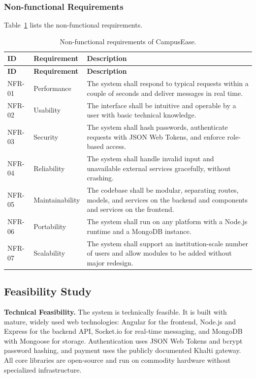 \documentclass[12pt,a4paper]{report}
\begin{document}
\subsubsection{Non-functional Requirements}

Table~\ref{tab:nfr} lists the non-functional requirements.

\begin{longtable}{|p{1.5cm}|p{3.5cm}|p{8cm}|}
\caption{Non-functional requirements of CampusEase.}
\label{tab:nfr}\\
\hline
\textbf{ID} & \textbf{Requirement} & \textbf{Description} \\
\hline
\endfirsthead
\hline
\textbf{ID} & \textbf{Requirement} & \textbf{Description} \\
\hline
\endhead
NFR-01 & Performance & The system shall respond to typical requests within a couple of seconds and deliver messages in real time. \\
\hline
NFR-02 & Usability & The interface shall be intuitive and operable by a user with basic technical knowledge. \\
\hline
NFR-03 & Security & The system shall hash passwords, authenticate requests with JSON Web Tokens, and enforce role-based access. \\
\hline
NFR-04 & Reliability & The system shall handle invalid input and unavailable external services gracefully, without crashing. \\
\hline
NFR-05 & Maintainability & The codebase shall be modular, separating routes, models, and services on the backend and components and services on the frontend. \\
\hline
NFR-06 & Portability & The system shall run on any platform with a Node.js runtime and a MongoDB instance. \\
\hline
NFR-07 & Scalability & The system shall support an institution-scale number of users and allow modules to be added without major redesign. \\
\hline
\end{longtable}

\subsection{Feasibility Study}

\textbf{Technical Feasibility.}
The system is technically feasible. It is built with mature, widely used web technologies: Angular for the frontend, Node.js and Express for the backend API, Socket.io for real-time messaging, and MongoDB with Mongoose for storage. Authentication uses JSON Web Tokens and bcrypt password hashing, and payment uses the publicly documented Khalti gateway. All core libraries are open-source and run on commodity hardware without specialized infrastructure.
\end{document}
